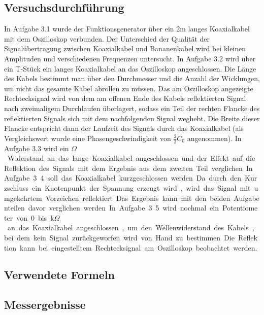 \documentclass[12pt,a4paper]{article}
\begin{document}
\subsection{Versuchsdurchführung}
In Aufgabe 3.1 wurde der Funktionsgenerator über ein 2m langes Koaxialkabel mit dem Oszilloskop verbunden. Der Unterschied der Qualität der Signalübertragung zwischen Koaxialkabel und Bananenkabel wird bei kleinen Amplituden und verschiedenen Frequenzen untersucht.
In Aufgabe 3.2 wird über ein T-Stück ein langes Koaxialkabel an das Oszilloskop angeschlossen. Die Länge des Kabels bestimmt man über den Durchmesser und die Anzahl der Wicklungen, um nicht das gesamte Kabel abrollen zu müssen. Das am Oszilloskop angezeigte Rechtecksignal wird von dem am offenen Ende des Kabels reflektierten Signal nach zweimaligem Durchlaufen überlagert, sodass ein Teil der rechten Flancke des reflektierten Signals sich mit dem nachfolgenden Signal weghebt. Die Breite dieser Flancke entspricht dann der Laufzeit des Signals durch das Koaxialkabel (als Vergleichswert wurde eine Phasengeschwindigkeit von $\frac{2}{3}C_0$ angenommen).
In Aufgabe 3.3 wird ein \unit[50]{$\Omega$} Widerstand an das lange Koaxialkabel angeschlossen und der Effekt auf die Reflektion des Signals mit dem Ergebnis aus dem zweiten Teil verglichen.
In Aufgabe 3.4 soll das Koaxialkabel kurzgeschlossen werden. Da durch den Kurzschluss ein Knotenpunkt der Spannung erzeugt wird, wird das Signal mit umgekehrtem Vorzeichen reflektiert. Das Ergebnis kann mit den beiden Aufgabenteilen davor verglichen werden.
In Aufgabe 3.5 wird nochmal ein Potentiometer von 0 bis \unit[1]{k$\Omega$} an das Koaxialkabel angeschlossen, um den Wellenwiderstand des Kabels, bei dem kein Signal zurückgeworfen wird von Hand zu bestimmen. Die Reflektion kann bei eingestelltem Rechtecksignal am Oszilloskop beobachtet werden.

\subsection{Verwendete Formeln}
\subsection{Messergebnisse}
\end{document}
